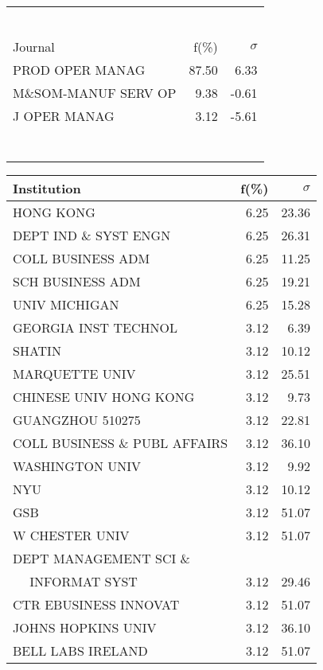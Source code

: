 \documentclass[a4paper,11pt]{report}
\begin{document}
\begin{landscape}
\begin{table}[!ht]
{\begin{tabular}{|l r  r|}
 &  & \\
 &  & \\
 &  & \\
 &  & \\
 &  & \\
 &  & \\
\hline
\hline
Journal & f(\%) & $\sigma$\\
\hline
PROD OPER MANAG & 87.50 & 6.33\\
M\&SOM-MANUF SERV OP & 9.38 & -0.61\\
J OPER MANAG & 3.12 & -5.61\\
 &  & \\
 &  & \\
 &  & \\
 &  & \\
 &  & \\
 &  & \\
 &  & \\
\hline
\end{tabular}
}
{\scriptsize\begin{tabular}{|l r r|}
\hline
Institution & f(\%) & $\sigma$\\
\hline
HONG KONG & 6.25 & 23.36\\
DEPT IND \& SYST ENGN & 6.25 & 26.31\\
COLL BUSINESS ADM & 6.25 & 11.25\\
SCH BUSINESS ADM & 6.25 & 19.21\\
UNIV MICHIGAN & 6.25 & 15.28\\
GEORGIA INST TECHNOL & 3.12 & 6.39\\
SHATIN & 3.12 & 10.12\\
MARQUETTE UNIV & 3.12 & 25.51\\
CHINESE UNIV HONG KONG & 3.12 & 9.73\\
GUANGZHOU 510275 & 3.12 & 22.81\\
COLL BUSINESS \& PUBL AFFAIRS & 3.12 & 36.10\\
WASHINGTON UNIV & 3.12 & 9.92\\
NYU & 3.12 & 10.12\\
GSB & 3.12 & 51.07\\
W CHESTER UNIV & 3.12 & 51.07\\
DEPT MANAGEMENT SCI \& &  & \\
$\quad$ INFORMAT SYST & 3.12 & 29.46\\
CTR EBUSINESS INNOVAT & 3.12 & 51.07\\
JOHNS HOPKINS UNIV & 3.12 & 36.10\\
BELL LABS IRELAND & 3.12 & 51.07\\

\end{tabular}}
\end{table}
\end{landscape}
\end{document}
